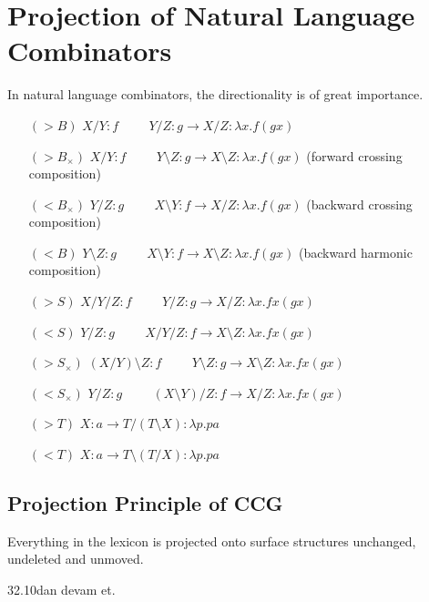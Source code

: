 \documentclass[12pt,a4paper]{article}
\begin{document}
\section{Projection of Natural Language Combinators}
In natural language combinators, the directionality is of great importance.
\begin{itemize}
\item[$(>B)$ ] \hspace{1cm} $X/Y:f \hspace{1cm} Y/Z:g \rightarrow X/Z:\lambda x.f(gx)$
\item[$(>B_\times)$] \hspace{1cm} $X/Y:f \hspace{1cm} Y\setminus Z:g \rightarrow X\setminus Z:\lambda x.f(gx)$ (forward crossing composition)
\item[$(<B_\times)$] \hspace{1cm} $Y/Z:g \hspace{1cm} X\setminus Y:f \rightarrow X/Z:\lambda x.f(gx)$ (backward crossing composition)
\item[$(<B)$ ] \hspace{1cm} $Y\setminus Z:g \hspace{1cm} X\setminus Y:f \rightarrow X\setminus Z:\lambda x.f(gx)$ (backward harmonic composition)
\item[$(>S)$ ] \hspace{1cm} $X/Y/Z:f \hspace{1cm} Y/Z:g \rightarrow X/Z:\lambda x.fx(gx)$
\item[$(<S)$ ] \hspace{1cm} $Y/Z:g \hspace{1cm} X/Y/Z:f \rightarrow X\setminus Z:\lambda x.fx(gx)$
\item[$(>S_\times)$] \hspace{1cm} $(X/Y)\setminus Z:f \hspace{1cm} Y\setminus Z:g \rightarrow X\setminus Z:\lambda x.fx(gx)$
\item[$(<S_\times)$] \hspace{1cm} $Y/Z:g \hspace{1cm} (X\setminus Y)/Z:f \rightarrow X/Z:\lambda x.fx(gx)$
\item[$(>T)$ ] \hspace{1cm} $X:a \rightarrow T/(T\setminus X):\lambda p.pa$
\item[$(<T)$ ] \hspace{1cm} $X:a \rightarrow T\setminus(T/X):\lambda p.pa$
\end{itemize}

\subsection{Projection Principle of CCG}
Everything in the lexicon is projected onto surface structures unchanged, undeleted and unmoved.

32.10dan devam et.
\end{document}
